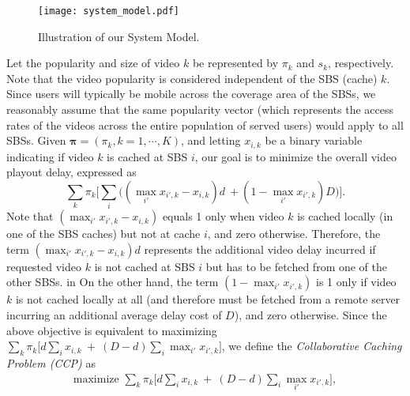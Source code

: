 \documentclass[conference]{IEEEtran}
\begin{document}
\begin{figure}[htb]
   \vspace{-0.1in}
    \centering
    \texttt{[image: system\_model.pdf]}
    \caption{Illustration of our System Model.}
    \vspace{-0.05in}
    \label{fig:model}
\end{figure}
Let the popularity and size of video $k$ be represented by $\pi_k$ and $s_k$, respectively. Note that the video popularity is considered independent of the SBS (cache) $k$. Since users will typically be mobile across the coverage area of the SBSs, we reasonably assume that the same popularity vector (which represents the access rates of the videos across the entire population of served users) would apply to all SBSs. Given $\mathbf{\pi} = (\pi_k, k=1, \cdots, K)$, and letting $x_{i,k}$ be a binary variable indicating if video $k$ is cached at SBS $i$, our goal is to minimize the overall video playout delay, expressed as 
$$\sum_k \pi_k  \bigg[ \sum_i \Big( \left(\max_{i'} x_{{i'},k}-x_{i,k}\right)  d \ + \left(1- \max_{i'} x_{{i'},k}\right) D \Big) \bigg].$$
Note that  $\left(\max_{i'} x_{{i'},k}-x_{i,k}\right)$ equals 1 only when video $k$ is cached locally (in one of the SBS caches) but not at cache $i$, and zero otherwise. Therefore, the term $\left(\max_{i'} x_{{i'},k}-x_{i,k}\right) d$ represents the additional video delay incurred if requested video $k$ is not cached at SBS $i$ but has to be fetched from one of the other SBSs. in On the other hand, the term $\left(1- \max_{i'} x_{{i'},k}\right)$ is 1 only if video $k$ is not cached locally at all (and therefore must be fetched from a remote server incurring an additional average delay cost of $D$), and zero otherwise. Since the above objective is equivalent to maximizing $\sum_k \pi_k  \bigg[ d \sum_i x_{i,k}  \ + \  (D-d)  \sum_i \max_{i'} x_{{i'},k} \bigg]$, we define the \textit{Collaborative Caching Problem (CCP)} as
\vspace{-0.05in}
\begin{eqnarray}
\mbox{maximize  } \sum_k \pi_k  \bigg[ d \sum_i x_{i,k}  \ + \  (D-d)  \sum_i \max_{i'} x_{{i'},k} \bigg],
\label{eq:obj}
\end{eqnarray}
\end{document}

